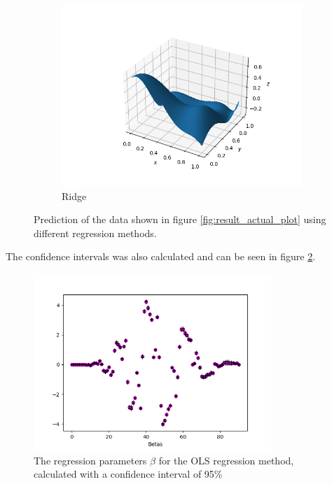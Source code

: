 \documentclass[../main.tex]{subfiles}
\begin{document}
\begin{figure}[htb!]
    \begin{subfigure}[b]{0.48\textwidth}
        \centering
        \includegraphics[trim=2.4cm 1cm 1.4cm 1cm, clip,width=1.1\textwidth]{../assets/ridge_franke_plot.png}
        \caption{Ridge}
    \end{subfigure}
    \caption{Prediction of the data shown in figure \ref{fig:result_actual_plot} using different regression methods.}
    \label{fig:result_reg_plots}
\end{figure}

The confidence intervals was also calculated and can be seen in figure \ref{fig:OLS_CI_franke}.

\begin{figure}[H]
 \centering
    \includegraphics[width=0.8\textwidth]{../assets/ols_franke_CI.png} 
    \caption{The regression parameters $\beta$ for the OLS regression method, calculated with a confidence interval of 95\%}
    \label{fig:OLS_CI_franke}
\end{figure}
\end{document}
